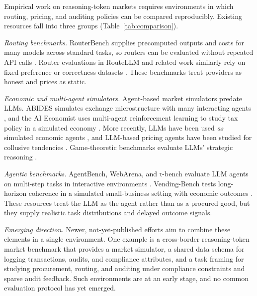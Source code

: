 Empirical work on reasoning-token markets requires environments in which routing, pricing, and auditing policies can be compared reproducibly. Existing resources fall into three groups (Table~\ref{tab:comparison}).

\emph{Routing benchmarks.} RouterBench supplies precomputed outputs and costs for many models across standard tasks, so routers can be evaluated without repeated API calls \cite{hu2024routerbench}. Router evaluations in RouteLLM and related work similarly rely on fixed preference or correctness datasets \cite{ong2025routellm, shnitzer2023routing}. These benchmarks treat providers as honest and prices as static.

\emph{Economic and multi-agent simulators.} Agent-based market simulators predate LLMs. ABIDES simulates exchange microstructure with many interacting agents \cite{byrd2020abides}, and the AI Economist uses multi-agent reinforcement learning to study tax policy in a simulated economy \cite{zheng2022aieconomist}. More recently, LLMs have been used \emph{as} simulated economic agents \cite{horton2023homosilicus, park2023generative, li2024econagent}, and LLM-based pricing agents have been studied for collusive tendencies \cite{fish2024collusion}. Game-theoretic benchmarks evaluate LLMs' strategic reasoning \cite{duan2024gtbench}.

\emph{Agentic benchmarks.} AgentBench, WebArena, and τ-bench evaluate LLM agents on multi-step tasks in interactive environments \cite{liu2024agentbench, zhou2024webarena, yao2024taubench}. Vending-Bench tests long-horizon coherence in a simulated small-business setting with economic outcomes \cite{backlund2025vending}. These resources treat the LLM as the agent rather than as a procured good, but they supply realistic task distributions and delayed outcome signals.

\emph{Emerging direction.} Newer, not-yet-published efforts aim to combine these elements in a single environment. One example is a cross-border reasoning-token market benchmark that provides a market simulator, a shared data schema for logging transactions, audits, and compliance attributes, and a task framing for studying procurement, routing, and auditing under compliance constraints and sparse audit feedback. Such environments are at an early stage, and no common evaluation protocol has yet emerged.


